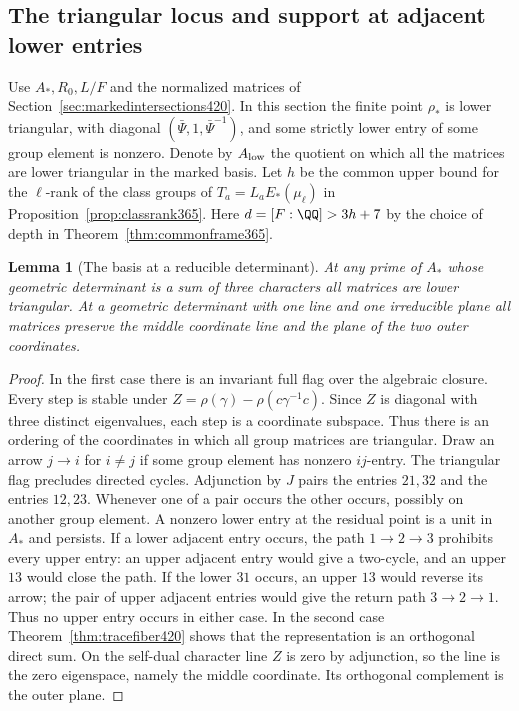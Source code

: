 \documentclass[a4paper,11pt]{article}
\newtheorem{lemma}[proposition]{Lemma}
\theoremstyle{definition}
\theoremstyle{remark}
\numberwithin{equation}{section}
\begin{document}
\subsection{The triangular locus and support at adjacent lower entries}
\label{sec:lowerchartcoverage421}

Use \(A_*,R_0,L/F\) and the normalized matrices of
Section~\ref{sec:markedintersections420}. In this section the
finite point \(\rho_*\) is lower triangular, with diagonal
\((\bar\Psi,1,\bar\Psi^{-1})\), and some strictly lower entry
of some group element is nonzero. Denote by \(A_{\rm low}\)
the quotient on which all the matrices are lower triangular
in the marked basis. Let \(h\) be the common upper bound for
the \(\ell\)-rank of the class groups of
\(T_a=L_aE_*(\mu_\ell)\) in
Proposition~\ref{prop:classrank365}. Here \(d=[F:\QQ]>3h+7\)
by the choice of depth in Theorem~\ref{thm:commonframe365}.

\begin{lemma}[The basis at a reducible determinant]\leavevmode
\label{lem:splitorder421}
At any prime of \(A_*\) whose geometric determinant is a sum
of three characters all matrices are lower triangular. At a
geometric determinant with one line and one irreducible plane
all matrices preserve the middle coordinate line and the plane
of the two outer coordinates.
\end{lemma}
\begin{proof}
In the first case there is an invariant full flag over the
algebraic closure. Every step is stable under
\(Z=\rho(\gamma)-\rho(c\gamma^{-1}c)\). Since \(Z\) is diagonal
with three distinct eigenvalues, each step is a coordinate
subspace. Thus there is an ordering of the coordinates in
which all group matrices are triangular. Draw an arrow
\(j\to i\) for \(i\ne j\) if some group element has nonzero
\(ij\)-entry. The triangular flag precludes directed cycles.
Adjunction by \(J\) pairs the entries \(21,32\) and the entries
\(12,23\). Whenever one of a pair occurs the other occurs,
possibly on another group element. A nonzero lower entry at
the residual point is a unit in \(A_*\) and persists. If a
lower adjacent entry occurs, the path \(1\to2\to3\) prohibits
every upper entry: an upper adjacent entry would give a
two-cycle, and an upper \(13\) would close the path. If the
lower \(31\) occurs, an upper \(13\) would reverse its arrow;
the pair of upper adjacent entries would give the return path
\(3\to2\to1\). Thus no upper entry occurs in either case.
In the second case Theorem~\ref{thm:tracefiber420} shows that
the representation is an orthogonal direct sum. On the self-dual
character line \(Z\) is zero by adjunction, so the line is the
zero eigenspace, namely the middle coordinate. Its orthogonal
complement is the outer plane.
\end{proof}
\end{document}
